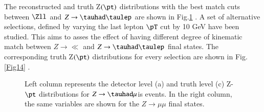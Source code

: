 The reconstructed and truth Z$(\pt)$ distributions with the best match cuts between $\Zll$ and $Z\to\tauhad\taulep$ are shown in Fig.\ref{Fig13} . A set of alternative selections, defined by varying the last lepton $\pT$ cut by 10 GeV have been studied. This aims to asses the effect of having different degree of kinematic match between $Z\to\ll$ and $Z\to\tauhad\taulep$ final states. The corresponding truth Z$(\pt)$ distributions for every selection are shown in Fig.\ref{Fig14} .

\begin{figure}[htbp]
	\centering
	\hfill
	\caption{Left column represents the detector level (a) and truth level (c) Z-$\pt$ distributions for $Z\to\tauhad\mu$is events. In the right column, the same variables are shown for the $Z\to\mu\mu$ final states.}
	\label{Fig13}
\end{figure}

